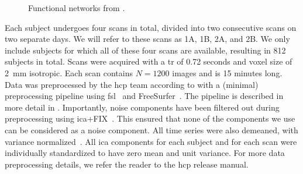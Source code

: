 \begin{figure}[t]
  \hspace{0.08\textwidth}
  \hspace{0.08\textwidth}
  \caption{
    Functional networks from \textcite{Smith2009}.
  }\label{fig:brainmap-functional-networks}
\end{figure}

\captionsetup[subfigure]{labelformat=parens}


Each subject undergoes four scans in total, divided into two consecutive scans on two separate days.
We will refer to these scans as 1A, 1B, 2A, and 2B.
We only include subjects for which all of these four scans are available, resulting in 812 subjects in total.
Scans were acquired with a \gls{tr} of 0.72 seconds and voxel size of 2~mm isotropic.
Each scan contains $N = 1200$ images and is 15 minutes long.
%
Data was preprocessed by the \gls{hcp} team according to \textcite{Smith2013a} with a (minimal) preprocessing pipeline using \gls{fsl}~\parencite{Jenkinson2012} and FreeSurfer~\parencite{Fischl2012}.
The pipeline is described in more detail in \textcite{Jenkinson2002, Glasser2013, Smith2013b}.
Importantly, noise components have been filtered out during preprocessing using \gls{ica}+FIX~\parencite{Salimi2014, Griffanti2014}.
This ensured that none of the components we use can be considered as a noise component.
All time series were also demeaned, with variance normalized~\parencite{Beckmann2004}.
All \gls{ica} components for each subject and for each scan were individually standardized to have zero mean and unit variance.
For more data preprocessing details, we refer the reader to the \gls{hcp} release manual.

